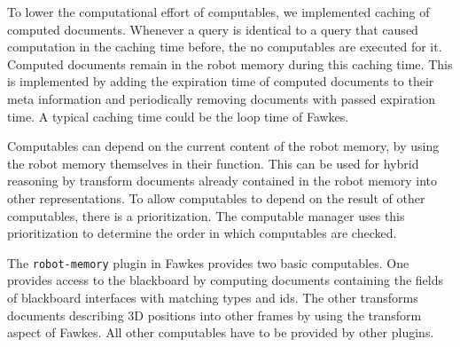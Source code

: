 To lower the computational effort of computables, we implemented
caching of computed documents. Whenever a query is identical to a
query that caused computation in the caching time before, the no
computables are executed for it. Computed documents remain in the
robot memory during this caching time. This is implemented by adding
the expiration time of computed documents to their meta information
and periodically removing documents with passed expiration time.
A typical caching time could be the loop time of Fawkes.

Computables can depend on the current content of the robot memory, by
using the robot memory themselves in their function. This can be used
for hybrid reasoning by transform documents already contained in the
robot memory into other representations. To allow computables to
depend on the result of other computables, there is a
prioritization. The computable manager uses this prioritization to
determine the order in which computables are checked.

The \texttt{robot-memory} plugin in Fawkes provides two basic
computables. One provides access to the blackboard by computing
documents containing the fields of blackboard interfaces with matching
types and ids. The other transforms documents describing 3D positions
into other frames by using the transform aspect of Fawkes. All other
computables have to be provided by other plugins.

